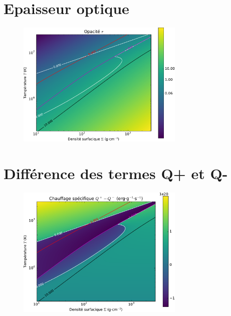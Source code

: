 \documentclass[french]{beamer}
\begin{document}
\section{Epaisseur optique}
\begin{frame}

   \begin{figure}[htb!]
      \includegraphics[width=8cm]{figures/tau_map.pdf}
   \end{figure}
\end{frame}

\section{Différence des termes Q+ et Q-}
\begin{frame}

   \begin{figure}[htb!]
      \includegraphics[width=8cm]{figures/Qmap.pdf}
   \end{figure}
\end{frame}

\end{document}
